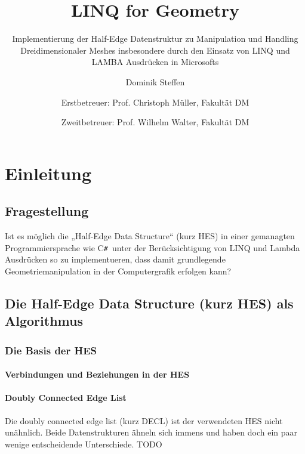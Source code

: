 \documentclass[12pt,a4paper]{scrreprt}
\author{
Dominik Steffen \and
Erstbetreuer: Prof. Christoph Müller, Fakultät DM \and
Zweitbetreuer: Prof. Wilhelm Walter, Fakultät DM
}
\title{LINQ for Geometry}
\subtitle{Implementierung der Half-Edge Datenstruktur zu Manipulation und Handling Dreidimensionaler Meshes insbesondere durch den Einsatz von LINQ und LAMBA Ausdrücken in Microsofts \CS}
\newcommand{\CSS}{C\texttt{\# }}
\begin{document}
\maketitle
\newpage

\begingroup
	\clearpage
	\pagestyle{empty}
	\renewcommand*{\chapterpagestyle}{empty}
	\tableofcontents
	\clearpage
\endgroup

\pagestyle{plain}
\setcounter{page}{1}










\chapter {Einleitung}
	\section {Fragestellung}
		Ist es möglich die „Half-Edge Data Structure“ (kurz HES) in einer gemanagten Programmiersprache wie \CSS unter der Berücksichtigung von LINQ und Lambda Ausdrücken so zu implementueren, dass damit grundlegende Geometriemanipulation in der Computergrafik erfolgen kann?
	\section {Die Half-Edge Data Structure (kurz HES) als Algorithmus}
		\subsection {Die Basis der HES}
			\subsubsection {Verbindungen und Beziehungen in der HES}
			\subsubsection {Doubly Connected Edge List}
			Die doubly connected edge list (kurz DECL) ist der verwendeten HES nicht unähnlich. Beide Datenstrukturen ähneln sich immens und haben doch ein paar wenige entscheidende Unterschiede. TODO
\end{document}
